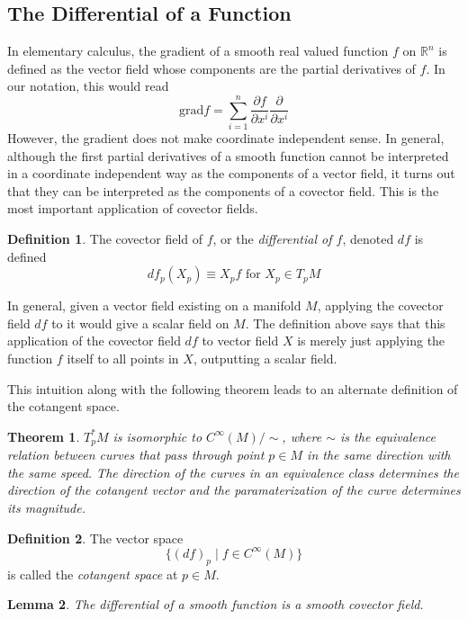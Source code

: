\documentclass{article}
\newtheorem{theorem}{Theorem}[section]
\newtheorem{lemma}[theorem]{Lemma}
\theoremstyle{remark}
\theoremstyle{definition}
\newtheorem{definition}{Definition}[section]
\begin{document}
\subsection{The Differential of a Function}
In elementary calculus, the gradient of a smooth real valued function $f$ on $\mathbb{R}^n$ is defined as the vector field whose components are the partial derivatives of $f$. In our notation, this would read
\[\text{grad} f = \sum_{i=1}^n \frac{\partial f}{\partial x^i} \frac{\partial}{\partial x^i}\]
However, the gradient does not make coordinate independent sense. In general, although the first partial derivatives of a smooth function cannot be interpreted in a coordinate independent way as the components of a vector field, it turns out that they can be interpreted as the components of a covector field. This is the most important application of covector fields. 

\begin{definition}
The covector field of $f$, or the \textit{differential of $f$}, denoted $df$ is defined
\[df_p (X_p) \equiv X_p f \text{ for } X_p \in T_p M\]
\end{definition}

In general, given a vector field existing on a manifold $M$, applying the covector field $df$ to it would give a scalar field on $M$. The definition above says that this application of the covector field $df$ to vector field $X$ is merely just applying the function $f$ itself to all points in $X$, outputting a scalar field. 

This intuition along with the following theorem leads to an alternate definition of the cotangent space. 

\begin{theorem}
$T_p^* M$ is isomorphic to $C^\infty(M) / \sim$, where $\sim$ is the equivalence relation between curves that pass through point $p \in M$ in the same direction with the same speed. The direction of the curves in an equivalence class determines the direction of the cotangent vector and the paramaterization of the curve determines its magnitude. 
\end{theorem}

\begin{definition}
The vector space 
\[ \{ (d f)_{p} \; | \; f \in C^{\infty} (M) \} \]
is called the \textit{cotangent space} at $p \in M$. 
\end{definition}

\begin{lemma}
The differential of a smooth function is a smooth covector field. 
\end{lemma}
\end{document}
